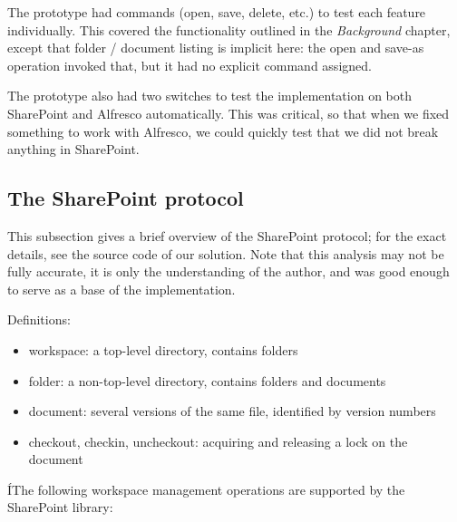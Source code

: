 The prototype had commands (open, save, delete, etc.) to test each feature
individually.  This covered the functionality outlined in the \emph{Background}
chapter, except that folder / document listing is implicit here: the open and
save-as operation invoked that, but it had no explicit command assigned.

The prototype also had two switches to test the implementation on both
SharePoint and Alfresco automatically. This was critical, so that when we fixed
something to work with Alfresco, we could quickly test that we did not break
anything in SharePoint.

\subsection{The SharePoint protocol}

This subsection gives a brief overview of the SharePoint protocol; for the
exact details, see the source code of our solution. Note that this analysis may
not be fully accurate, it is only the understanding of the author, and was good
enough to serve as a base of the implementation.

Definitions:

\begin{itemize}
\item workspace: a top-level directory, contains folders
\item folder: a non-top-level directory, contains folders and documents
\item document: several versions of the same file, identified by version numbers
\item checkout, checkin, uncheckout: acquiring and releasing a lock on the document
\end{itemize}

ÍThe following workspace management operations are supported by the SharePoint
library:

